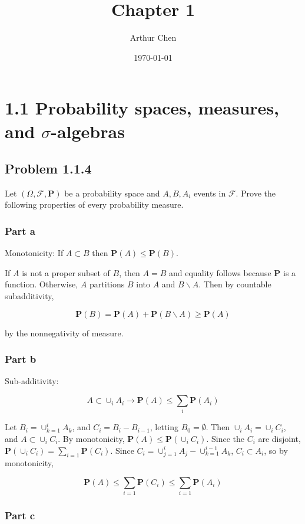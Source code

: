 \documentclass{article}
\author{Arthur Chen}
\title{Chapter 1}
\date{\today}
\newcommand{\F}{\mathcal{F}}
\newcommand{\prob}{\boldsymbol{P}}
\begin{document}
\maketitle

\section*{1.1 Probability spaces, measures, and $\sigma$-algebras}

\subsection*{Problem 1.1.4}

Let $(\Omega, \F, \prob)$ be a probability space and $A, B, A_i$ events in $\F$. Prove the following properties of every probability measure.

\subsubsection*{Part a}

Monotonicity: If $A \subset B$ then $\prob(A) \leq \prob(B)$.

If $A$ is not a proper subset of $B$, then $A=B$ and equality follows because $\prob$ is a function. Otherwise, $A$ partitions $B$ into $A$ and $B \backslash A$. Then by countable subadditivity,

\[
\prob(B) = \prob(A) + \prob(B \backslash A) \geq \prob(A)
\]

by the nonnegativity of measure.

\subsubsection*{Part b}

Sub-additivity:

\[
A \subset \cup_i A_i \longrightarrow \prob(A) \leq \sum_i \prob(A_i)
\]

Let $B_i = \cup_{k=1}^i A_k$, and $C_i = B_i - B_{i-1}$, letting $B_0 = \emptyset$. Then $\cup_i A_i = \cup_i C_i$, and $A \subset \cup_i C_i$. By monotonicity, $\prob(A) \leq \prob(\cup_i C_i)$. Since the $C_i$ are disjoint, $\prob(\cup_i C_i) = \sum_{i=1} \prob(C_i)$. Since $C_i = \cup_{j=1}^i A_j - \cup_{k=1}^{i-1}A_k$, $C_i \subset A_i$, so by monotonicity,

\[
\prob(A) \leq \sum_{i=1} \prob(C_i) \leq \sum_{i=1} \prob(A_i)
\]

\subsubsection*{Part c}
\end{document}
